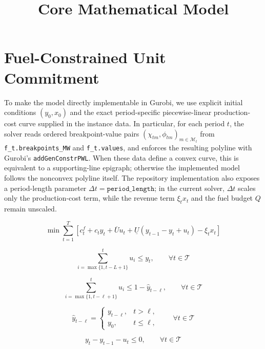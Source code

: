 \documentclass{article}
\title{Core Mathematical Model}
\date{}
\begin{document}
\maketitle

\section*{Fuel-Constrained Unit Commitment}

To make the model directly implementable in Gurobi, we use explicit initial conditions $(y_0,x_0)$ and the exact period-specific piecewise-linear production-cost curve supplied in the instance data. In particular, for each period $t$, the solver reads ordered breakpoint-value pairs $(\chi_{tm},\phi_{tm})_{m\in\mathcal{M}_t}$ from \texttt{f\_t.breakpoints\_MW} and \texttt{f\_t.values}, and enforces the resulting polyline with Gurobi's \texttt{addGenConstrPWL}. When these data define a convex curve, this is equivalent to a supporting-line epigraph; otherwise the implemented model follows the nonconvex polyline itself. The repository implementation also exposes a period-length parameter $\Delta t = \texttt{period\_length}$; in the current solver, $\Delta t$ scales only the production-cost term, while the revenue term $\xi_t x_t$ and the fuel budget $Q$ remain unscaled.

\begin{equation}
\min
\sum_{t=1}^T
\left[
c_t^f + c_t y_t + \overline{U}u_t
+ \underline{U}(y_{t-1} - y_t + u_t)
- \xi_t x_t
\right]
\tag{1a}
\end{equation}

\begin{equation}
\sum_{i=\max\{1,t-L+1\}}^{t} u_i \le y_t,
\qquad \forall t \in \mathcal{T}
\tag{1b}
\end{equation}

\begin{equation}
\sum_{i=\max\{1,t-\ell+1\}}^{t} u_i \le 1-\hat{y}_{t-\ell},
\qquad \forall t \in \mathcal{T}
\tag{1c}
\end{equation}

\begin{equation}
\hat{y}_{t-\ell} =
\begin{cases}
y_{t-\ell}, & t > \ell,\\
y_0, & t \le \ell,
\end{cases}
\qquad \forall t \in \mathcal{T}
\tag{1c'}
\end{equation}

\begin{equation}
y_t - y_{t-1} - u_t \le 0,
\qquad \forall t \in \mathcal{T}
\tag{1d}
\end{equation}
\end{document}
